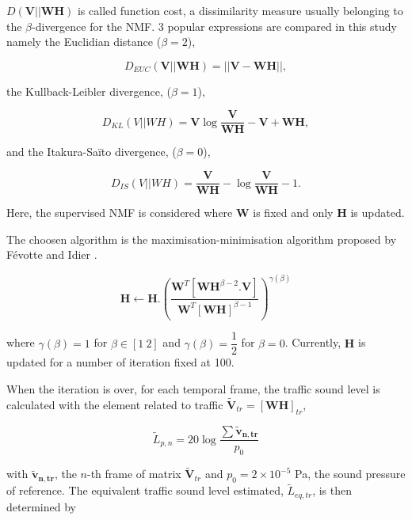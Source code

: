 \documentclass{article}
\begin{document}
\begin{sloppy}
$D(\mathbf{V}\vert\vert \mathbf{WH})$ is called function cost, a dissimilarity measure usually belonging to the $\beta$-divergence for the NMF. 3 popular expressions are compared in this study namely the Euclidian distance ($\beta = 2$),

\begin{equation}\label{eq:distEUC}
D_{EUC}(\mathbf{V} \vert \vert \mathbf{WH}) =  \vert\vert \mathbf{V} - \mathbf{WH} \vert\vert , 
\end{equation} 

the Kullback-Leibler divergence, ($\beta = 1$), 

\begin{equation}\label{eq:divKL}
D_{KL}(V\vert\vert WH) = \mathbf{V}\log\frac{\mathbf{V}}{\mathbf{WH}}-\mathbf{V}+\mathbf{WH},
\end{equation}

and the Itakura-Saïto divergence, ($\beta = 0$), 
 
\begin{equation}\label{eq:divIS}
D_{IS}(V\vert\vert WH) = \frac{\mathbf{V}}{\mathbf{WH}} -\log\frac{\mathbf{V}}{\mathbf{WH}}-1.
\end{equation}

Here, the supervised NMF is considered where $\mathbf{W}$ is fixed and only $\mathbf{H}$ is updated.

The choosen algorithm is the maximisation-minimisation algorithm proposed by F\'{e}votte and Idier \cite{fevotte2011}.

\begin{equation}
\mathbf{H} \longleftarrow \mathbf{H}.\left(\frac{\mathbf{W}^T\left[\mathbf{WH}^{\beta-2}.\mathbf{V} \right]}{\mathbf{W}^T \left[ \mathbf{WH} \right]^{\beta-1}}\right)^{\gamma(\beta)}
\end{equation}

where $\gamma(\beta) = 1$ for $\beta \in [1~2]$ and $\gamma(\beta) = \dfrac{1}{2}$ for $\beta = 0$. Currently, $\mathbf{H}$ is updated for a number of iteration fixed at 100.

When the iteration is over, for each temporal frame, the traffic sound level is calculated with the element related to traffic $\mathbf{\tilde{V}}_{tr} = \left[\mathbf{WH}\right]_{tr}$,

\begin{equation}\label{eq:Lp}
\tilde{L}_{p,n} = 20\log\frac{\sum\mathbf{\mathbf{\tilde{v}}_{\mathbf{n},tr}}}{p_{0}}
\end{equation}

with $\mathbf{\tilde{v}_{n,tr}}$, the $n$-th frame of matrix $\mathbf{\tilde{V}}_{tr}$ and $ p_{0} = 2\times 10^{-5}$ Pa, the sound pressure of reference. The equivalent traffic sound level estimated, $\tilde{L}_{eq,tr}$, is then determined by


\end{sloppy}
\end{document}
